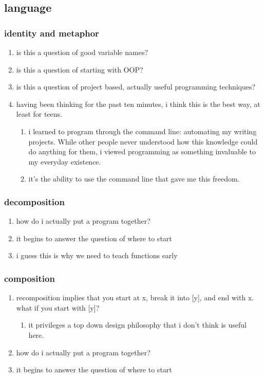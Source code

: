 \subsection{language}
\subsubsection{identity and metaphor}
\begin{enumerate}
	\item is this a question of good variable names?
	\item is this a question of starting with OOP?
	\item is this a question of project based, actually useful programming techniques?
	\item having been thinking for the past ten minutes, i think this is the best way, at least for teens.
	\begin{enumerate}
		\item i learned to program through the command line: automating my writing projects. While other people never understood how this knowledge could do anything for them, i viewed programming as something invaluable to my everyday existence.
		\item it's the ability to use the command line that gave me this freedom.
	\end{enumerate}
\end{enumerate}
\subsubsection{decomposition}
\begin{enumerate}
	\item how do i actually put a program together?
	\item it begins to answer the question of where to start
	\item i guess this is why we need to teach functions early
\end{enumerate}
\subsubsection{composition}
\begin{enumerate}
	\item recomposition implies that you start at x, break it into [y], and end with x. what if you start with [y]?
	\begin{enumerate}
		\item it privileges a top down design philosophy that i don't think is useful here.
	\end{enumerate}
	\item how do i actually put a program together?
	\item it begins to answer the question of where to start
\end{enumerate}
